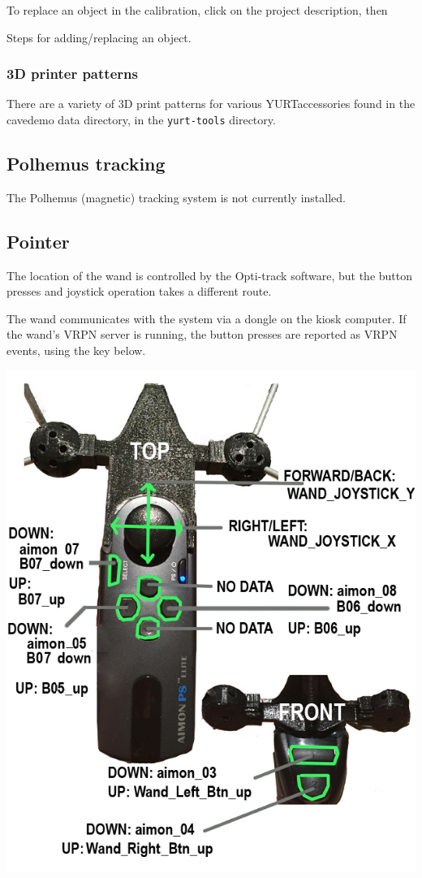 \documentclass[11pt]{article}
\newcommand{\yurt}{YURT}
\newcommand{\cmd}[1]{\texttt{#1}}
\begin{document}
To replace an object in the calibration, click on the project
description, then

Steps for adding/replacing an object.


\subsubsection{3D printer patterns}

There are a variety of 3D print patterns for various \yurt accessories
found in the cavedemo data directory, in the \cmd{yurt-tools} directory.


\subsection{Polhemus tracking}

The Polhemus (magnetic) tracking system is not currently installed.



\subsection{Pointer}

The location of the wand is controlled by the Opti-track software, but
the button presses and joystick operation takes a different route.

The wand communicates with the system via a dongle on the kiosk
computer.  If the wand's VRPN server is running, the button presses
are reported as VRPN events, using the key below.

\begin{center}
\includegraphics[width=0.6\columnwidth]{yurt-wand-controller.jpg}
\end{center}
\end{document}
